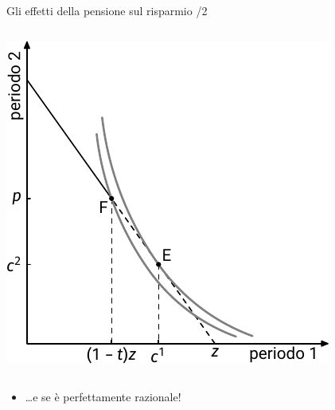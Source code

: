 \documentclass[11pt]{beamer}
\begin{document}
\begin{frame}{Gli effetti della pensione sul risparmio /2}
\begin{columns}
\begin{column}{.5\columnwidth}
\begin{center}
\includegraphics[width=\linewidth]{./figure/effetti-sul-risparmio-4.pdf}
\end{center}
\end{column}
\end{columns}

\begin{block}{}
\begin{itemize}
\item \ldots{}e se è perfettamente razionale!
\end{itemize}
\end{block}
\end{frame}
\end{document}
